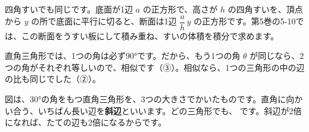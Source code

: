 四角すいでも同じです。底面が1辺 $a$ の正方形で、高さが $h$ の四角すいを、頂点から $y$ の所で底面に平行に切ると、断面は1辺 $\dfrac{a}{h}\,y$ の正方形です。第5巻の5-10では、この断面をうすい板にして積み重ね、すいの体積を積分で求めます。


\leavevmode\label{bk:4-3:chokkaku}直角三角形では、1つの角は必ず90°です。だから、もう1つの角 $\theta$ が同じなら、2つの角がそれぞれ等しいので、相似です（③）。相似なら、1つの三角形の中の辺の比も同じでした（②）。

\noindent\begin{minipage}[c]{0.48\linewidth}\centering
{}
\end{minipage}\hfill
\begin{minipage}[c]{0.48\linewidth}
図は、30°の角をもつ直角三角形を、3つの大きさでかいたものです。直角に向かい合う、いちばん長い辺を\textbf{斜辺}といいます。どの三角形でも、
です。斜辺が2倍になれば、たての辺も2倍になるからです。
\end{minipage}

